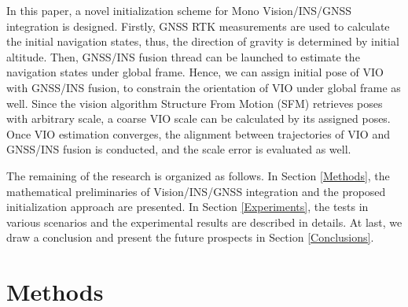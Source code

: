 \documentclass[journal,article,submit,moreauthors,pdftex]{Definitions/mdpi}
\begin{document}
In this paper, a novel initialization scheme for Mono Vision/INS/GNSS 
integration is designed. 
Firstly, GNSS RTK measurements are used to calculate the initial navigation 
states, thus, the direction of gravity is determined by initial altitude.
Then, GNSS/INS fusion thread can be launched to estimate the navigation 
states under global frame.
Hence, we can assign initial pose of VIO with GNSS/INS fusion, to constrain 
the orientation of VIO under global frame as well.
Since the vision algorithm Structure From Motion (SFM) retrieves poses with 
arbitrary scale, a coarse VIO scale can be calculated by its assigned poses.
Once VIO estimation converges, the alignment between trajectories of VIO and 
GNSS/INS fusion is conducted, and the scale error is evaluated as well.

The remaining of the research is organized as follows.
In Section \ref{Methods}, the mathematical preliminaries of 
Vision/INS/GNSS integration and the proposed initialization approach are 
presented.
In Section \ref{Experiments}, the tests in various scenarios and the 
experimental results are described in details.
At last, we draw a conclusion and present the future prospects in 
Section \ref{Conclusions}.

\section{Methods}
\end{document}
